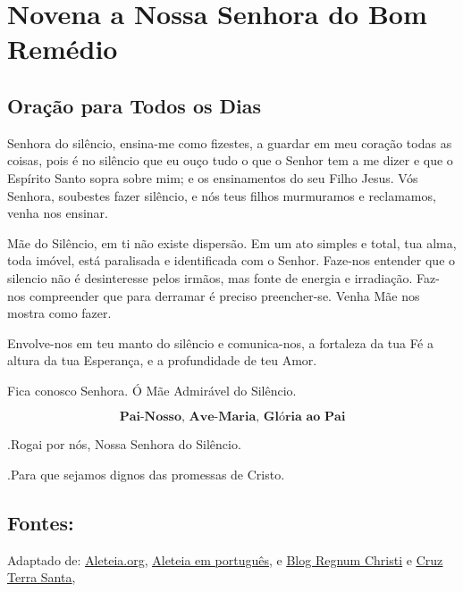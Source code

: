 \documentclass[a4paper,14pt]{extarticle} \usepackage[utf8]{inputenc}
\makeatletter
\newcommand{\vers@resp@sym}{%
  \raisebox{0.2ex}{\rotatebox[origin=c]{-20}{$\m@th\rceil$}}%
}
\newcommand{\vers@resp}[2]{%
  {\ooalign{%
     \hidewidth\kern#1\vers@resp@sym\hidewidth\cr
     #2\cr
  }}%
}
\DeclareRobustCommand{\versicle}{\vers@resp{-0.1em}{V}}
\DeclareRobustCommand{\response}{\vers@resp{0pt}{R}}
\makeatother
\begin{document}
\section{Novena a Nossa Senhora do Bom Remédio}


\subsection*{Oração para Todos os Dias}

Senhora do silêncio, ensina-me como fizestes, a guardar em meu coração todas as coisas, pois é no silêncio que eu ouço tudo o que o Senhor tem a me dizer e que o Espírito Santo sopra sobre mim; e os ensinamentos do seu Filho Jesus. Vós Senhora, soubestes fazer silêncio, e nós teus filhos murmuramos e reclamamos, venha nos ensinar.

Mãe do Silêncio, em ti não existe dispersão. Em um ato simples e total, tua alma, toda imóvel, está paralisada e identificada com o Senhor. Faze-nos entender que o silencio não é desinteresse pelos irmãos, mas fonte de energia e irradiação. Faz-nos compreender que para derramar é preciso preencher-se. Venha Mãe nos mostra como fazer.

Envolve-nos em teu manto do silêncio e comunica-nos, a fortaleza da tua Fé a altura da tua Esperança, e a profundidade de teu Amor.

Fica conosco Senhora. Ó Mãe Admirável do Silêncio.


\[
  \textbf{Pai-Nosso, Ave-Maria, Glória ao Pai}
\]

\response.\quad Rogai por nós, Nossa Senhora do Silêncio.

\versicle.\quad Para que sejamos dignos das promessas de Cristo.


\vfill

\begin{center}
\subsection*{Fontes:}
Adaptado de: \underline{\href{https://aleteia.org/2019/04/16/consecrate-yourself-to-our-lady-of-silence-with-this-prayer/}{Aleteia.org}}, \underline{\href{https://pt.aleteia.org/2017/11/28/por-que-o-papa-levou-nossa-senhora-do-silencio-para-o-vaticano/}{Aleteia em português}}, e  \underline{\href{https://www.regnumchristi.com/en/our-lady-of-silence/}{Blog Regnum Christi}} e \underline{\href{https://cruzterrasanta.com.br/historia-de-nossa-senhora-do-silencio/475/102/}{Cruz Terra Santa}},
\end{center}
\end{document}
